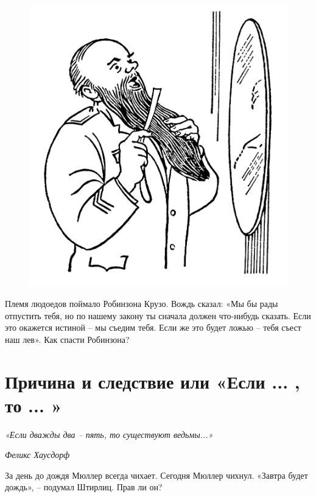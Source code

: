 \begin{figure}[H]
\begin{minipage}{0.2\linewidth}
    \includegraphics[width=0.95\columnwidth]{img/7.0 3 boroda.jpg}
\end{minipage}
\end{figure} 

\begin{thm}
    Племя людоедов поймало Робинзона Крузо. Вождь сказал: «Мы бы рады отпустить тебя, но по нашему закону ты сначала должен что-нибудь сказать. Если это окажется истиной – мы съедим тебя. Если же это будет ложью – тебя съест наш лев». Как спасти Робинзона?
\end{thm}

\section{Причина и следствие или «Если ... , то ... »}

\epigraph{\textit{«Если дважды два – пять, то существуют ведьмы...»}}{\textit{Феликс Хаусдорф}}

\begin{thm}
    За день до дождя Мюллер всегда чихает. Сегодня Мюллер чихнул. «Завтра будет дождь», – подумал Штирлиц. Прав ли он?
\end{thm}

